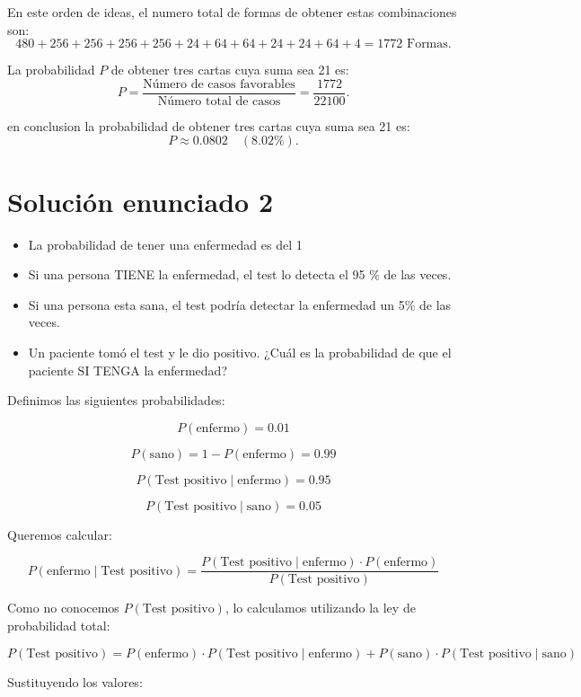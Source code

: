 \documentclass[a4paper,12pt]{article}
\begin{document}
	En este orden de ideas, el numero total de formas de obtener estas combinaciones son:
	\[
	480 + 256 + 256 + 256 + 256 + 24 + 64 + 64 + 24 + 24 + 64 + 4 = 1772 \text{ Formas}.
	\]
	
	
	La probabilidad \(P\) de obtener tres cartas cuya suma sea 21 es:
	\[
	P = \frac{\text{Número de casos favorables}}{\text{Número total de casos}} = \frac{1772}{22100}.
	\]

	en conclusion la probabilidad de obtener tres cartas cuya suma sea 21 es:
	\[
	P \approx 0.0802 \quad (8.02\%).
	\]
	
	\section{Soluci\'on enunciado 2}
	
	\begin{itemize}
		\item La probabilidad de tener una enfermedad es del 1%
		\item Si una persona TIENE la enfermedad, el test lo detecta el 95 \% de las veces.
		\item Si una persona esta sana, el test podría detectar la enfermedad un 5\% de las veces.
		\item Un paciente tomó el test y le dio positivo.  ¿Cuál es la probabilidad de que el paciente SI TENGA la enfermedad?
	\end{itemize}
	 Definimos las siguientes probabilidades:
	 
	 \[
	 P(\text{enfermo}) = 0.01
	 \]
	 
	 \[
	 P(\text{sano}) = 1 - P(\text{enfermo}) = 0.99
	 \]
	 
	 \[
	 P(\text{Test positivo} \mid \text{enfermo}) = 0.95
	 \]
	 
	 \[
	 P(\text{Test positivo} \mid \text{sano}) = 0.05
	 \]
	 
	 Queremos calcular:
	 
	 \[
	 P(\text{enfermo} \mid \text{Test positivo}) = \frac{P(\text{Test positivo} \mid \text{enfermo}) \cdot P(\text{enfermo})}{P(\text{Test positivo})}
	 \]
	 
	 Como no conocemos \( P(\text{Test positivo}) \), lo calculamos utilizando la ley de probabilidad total:
	 
	 \[
	 P(\text{Test positivo}) = P(\text{enfermo}) \cdot P(\text{Test positivo} \mid \text{enfermo}) + P(\text{sano}) \cdot P(\text{Test positivo} \mid \text{sano})
	 \]
	 
	 Sustituyendo los valores:
	 
\end{document}
